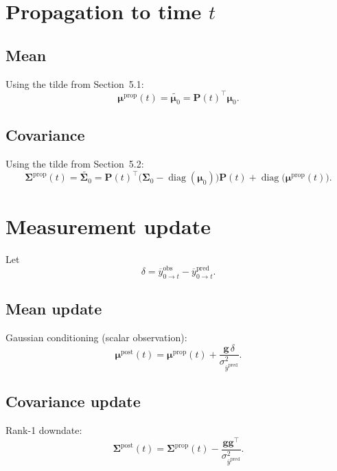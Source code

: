 \documentclass[11pt]{article}
\begin{document}
\section{Propagation to time \texorpdfstring{\(t\)}{t}}

\subsection{Mean}

Using the tilde from Section~5.1:
\[
  \boxed{
    \boldsymbol{\mu}^{\text{prop}}(t)
    =
    \widetilde{\boldsymbol{\mu}_0}
    =
    \mathbf{P}(t)^\top\boldsymbol{\mu}_0
  }.
\]

\subsection{Covariance}

Using the tilde from Section~5.2:
\[
  \boxed{
    \boldsymbol{\Sigma}^{\text{prop}}(t)
    =
    \widetilde{\boldsymbol{\Sigma}_0}
    =
    \mathbf{P}(t)^\top
    \bigl(\boldsymbol{\Sigma}_0-\operatorname{diag}(\boldsymbol{\mu}_0)\bigr)
    \mathbf{P}(t)
    +
    \operatorname{diag}\bigl(\boldsymbol{\mu}^{\text{prop}}(t)\bigr)
  }.
\]

\section{Measurement update}

Let
\[
  \delta =
  \overline{y}^{\text{obs}}_{0\to t}
  -
  \overline{y}^{\text{pred}}_{0\to t}.
\]

\subsection{Mean update}

Gaussian conditioning (scalar observation):
\[
  \boxed{
    \boldsymbol{\mu}^{\text{post}}(t)
    =
    \boldsymbol{\mu}^{\text{prop}}(t)
    +
    \frac{\mathbf{g}\,\delta}{
      \sigma^2_{\overline{y}^{\text{pred}}}
    }
  }.
\]

\subsection{Covariance update}

Rank-1 downdate:
\[
  \boxed{
    \boldsymbol{\Sigma}^{\text{post}}(t)
    =
    \boldsymbol{\Sigma}^{\text{prop}}(t)
    -
    \frac{\mathbf{g}\mathbf{g}^\top}{
      \sigma^2_{\overline{y}^{\text{pred}}}
    }
  }.
\]
\end{document}
